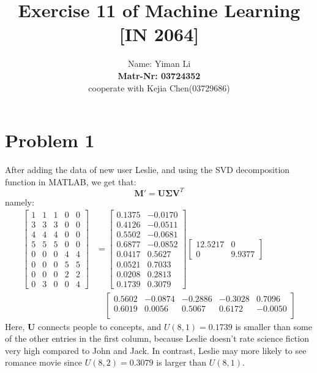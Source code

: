 \documentclass{article}
\title{Exercise 11 of Machine Learning [IN 2064]}
\author{
  Name: Yiman Li \\
  \textbf{Matr-Nr: 03724352} \\
  cooperate with Kejia Chen(03729686)\\
}
\begin{document}
\maketitle

\section*{Problem 1}
After adding the data of new user Leslie, and using the SVD decomposition function in MATLAB, we get that:
\begin{equation}
	\bm{M}' = \bm{U} \bm{\Sigma} \bm{V}^T
\end{equation}
namely:
\begin{equation}
	\begin{split}
	\left[
		\begin{array}{ccccc}
			1 & 1 & 1 & 0 & 0\\
			3 & 3 & 3 & 0 & 0\\
			4 & 4 & 4 & 0 & 0\\
			5 & 5 & 5 & 0 & 0\\
			0 & 0 & 0 & 4 & 4\\
			0 & 0 & 0 & 5 & 5\\
			0 & 0 & 0 & 2 & 2\\
			0 & 3 & 0 & 0 & 4
		\end{array}
	\right] &= \left[
		\begin{array}{ccc}
			0.1375 & -0.0170 \\
			0.4126 & -0.0511 \\
			0.5502 & -0.0681 \\
			0.6877 & -0.0852 \\
			0.0417 & 0.5627 \\
			0.0521 & 0.7033 \\
			0.0208 & 0.2813 \\
			0.1739 & 0.3079 
		\end{array}
	\right] \left[
		\begin{array}{ccc}
		12.5217 & 0 \\
		0 & 9.9377
		\end{array}
	\right]\\
	& \quad	\left[
		\begin{array}{ccccc}
			 0.5602 & -0.0874 & -0.2886 & -0.3028 & 0.7096\\
			0.6019 & 0.0056 & 0.5067 & 0.6172 & -0.0050\\
		\end{array}
	\right]
\end{split}
\end{equation}
Here, $\bm{U}$ connects people to concepts, and $U(8,1)=0.1739$ is smaller than some of the other entries in the first column, because Leslie doesn't rate science fiction very high compared to John and Jack. In contrast, Leslie may more likely to see romance movie since $U(8,2)=0.3079$ is larger than $U(8,1)$.
\end{document}
